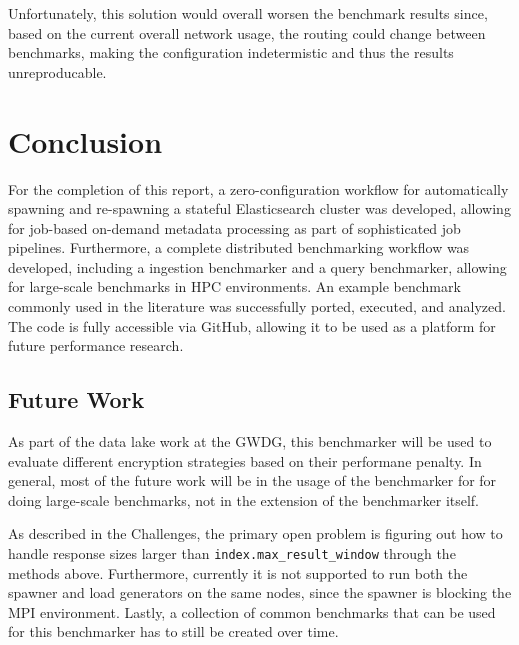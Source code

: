 Unfortunately, this solution would overall worsen the benchmark results since, based on the current overall network usage, the routing could change between benchmarks, making the configuration indetermistic and thus the results unreproducable.

\section{Conclusion}
For the completion of this report, a zero-configuration workflow for automatically spawning and re-spawning a stateful Elasticsearch cluster was developed, allowing for job-based on-demand metadata processing as part of sophisticated job pipelines. Furthermore, a complete distributed benchmarking workflow was developed, including a ingestion benchmarker and a query benchmarker, allowing for large-scale benchmarks in \ac{HPC} environments. An example benchmark commonly used in the literature was successfully ported, executed, and analyzed. The code is fully accessible via GitHub, allowing it to be used as a platform for future performance research.

\subsection{Future Work}
As part of the data lake work at the GWDG, this benchmarker will be used to evaluate different encryption strategies based on their performane penalty. In general, most of the future work will be in the usage of the benchmarker for for doing large-scale benchmarks, not in the extension of the benchmarker itself. 

As described in the Challenges, the primary open problem is figuring out how to handle response sizes larger than \texttt{index.max\_result\_window} through the methods above. Furthermore, currently it is not supported to run both the spawner and load generators on the same nodes, since the spawner is blocking the MPI environment. Lastly, a collection of common benchmarks that can be used for this benchmarker has to still be created over time.
